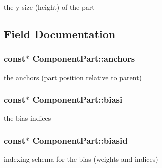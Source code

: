 the y size (height) of the part 



\subsection{Field Documentation}
\hypertarget{classComponentPart_a3809f39d41baf1990c72b12742ee650e}{}
\subsubsection[{anchors\+\_\+}]{ const$\ast$ Component\+Part\+::anchors\+\_\+\hspace{0.3cm}{\ttfamily [private]}}\label{classComponentPart_a3809f39d41baf1990c72b12742ee650e}


the anchors (part position relative to parent) 

\hypertarget{classComponentPart_abad6d42fe698b1755bdc1f07a582bc23}{}
\subsubsection[{biasi\+\_\+}]{ const$\ast$ Component\+Part\+::biasi\+\_\+\hspace{0.3cm}{\ttfamily [private]}}\label{classComponentPart_abad6d42fe698b1755bdc1f07a582bc23}


the bias indices 

\hypertarget{classComponentPart_a3251ad22cd72fb9ccf7fe18e597f84a0}{}
\subsubsection[{biasid\+\_\+}]{ const$\ast$ Component\+Part\+::biasid\+\_\+\hspace{0.3cm}{\ttfamily [private]}}\label{classComponentPart_a3251ad22cd72fb9ccf7fe18e597f84a0}


indexing schema for the bias (weights and indices) 

\hypertarget{classComponentPart_a361de825869afbad383a5b4ba1fbca31}{}
